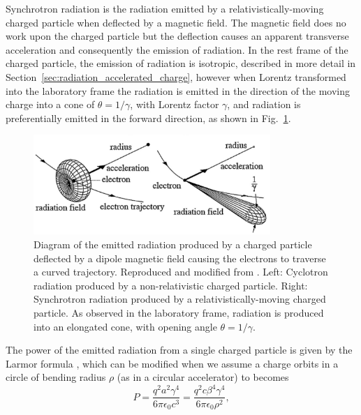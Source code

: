 \documentclass[../main.tex]{subfiles}
\begin{document}
Synchrotron radiation is the radiation emitted by a relativistically-moving charged particle when deflected by a magnetic field. The magnetic field does no work upon the charged particle but the deflection causes an apparent transverse acceleration and consequently the emission of radiation. In the rest frame of the charged particle, the emission of radiation is isotropic, described in more detail in Section~\ref{sec:radiation_accelerated_charge}, however when Lorentz transformed into the laboratory frame the radiation is emitted in the direction of the moving charge into a cone of $\theta = 1/\gamma$, with Lorentz factor $\gamma$, and radiation is preferentially emitted in the forward direction, as shown in Fig.~\ref{fig:synchrotron_radiation_diagram}. 
\begin{figure}[!h]
\centering
\includegraphics[width=0.8\textwidth]{Figures/Introduction/Synchrotron_Radiation_Diagram.pdf}
\caption{Diagram of the emitted radiation produced by a charged particle deflected by a dipole magnetic field causing the electrons to traverse a curved trajectory. Reproduced and modified from \cite{eberhardt2015synchrotron}. Left: Cyclotron radiation produced by a non-relativistic charged particle. Right: Synchrotron radiation produced by a relativistically-moving charged particle. As observed in the laboratory frame, radiation is produced into an elongated cone, with opening angle $\theta = 1/\gamma$.}
\label{fig:synchrotron_radiation_diagram}
\end{figure}
The power of the emitted radiation from a single charged particle is given by the Larmor formula \cite{larmor1897lxiii}, which can be modified when we assume a charge orbits in a circle of bending radius $\rho$ (as in a circular accelerator) to becomes
\begin{equation}
P = \frac{q^{2}a^{2}\gamma^{4}}{6\pi\epsilon_{0}c^{3}} = \frac{q^{2}c\beta^{4}\gamma^{4}}{6\pi\epsilon_{0}\rho^{2}},
\label{eq:synchrotron_radiation_power}    
\end{equation}
\end{document}
